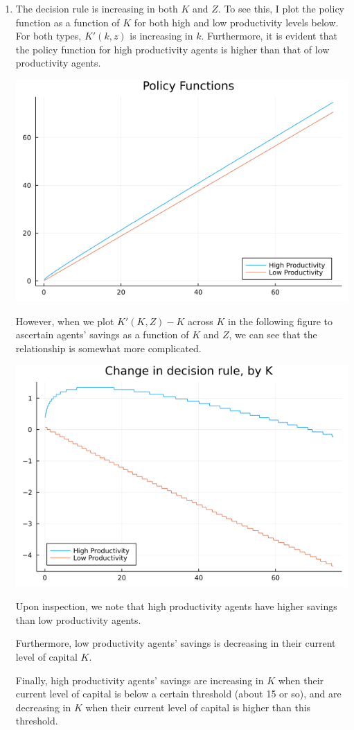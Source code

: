 \documentclass[12pt]{article}
\begin{document}
\begin{enumerate}
\begin{center}
    \end{center}
    \item The decision rule is increasing in both $K$ and $Z$. To see this, I plot the policy function as a function of $K$ for both high and low productivity levels below. For both types, $K'(k,z)$ is increasing in $k$. Furthermore, it is evident that the policy function for high productivity agents is higher than that of low productivity agents.
    \begin{center}
        \includegraphics[scale=0.4]{pfplot.png}
    \end{center}
    However, when we plot $K'(K, Z) - K$ across $K$ in the following figure to ascertain agents' savings as a function of $K$ and $Z$, we can see that the relationship is somewhat more complicated. 
    \begin{center}
        \includegraphics[scale=0.4]{netpfplot.png}
    \end{center}
    Upon inspection, we note that high productivity agents have higher savings than low productivity agents.
    
    Furthermore, low productivity agents' savings is decreasing in their current level of capital $K$.

    Finally, high productivity agents' savings are increasing in $K$ when their current level of capital is below a certain threshold (about 15 or so), and are decreasing in $K$ when their current level of capital is higher than this threshold. 

	\end{enumerate}
\end{document}
